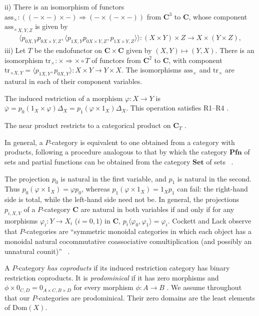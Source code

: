 \documentclass[letterpaper,10pt]{amsart}
\theoremstyle{plain}
\theoremstyle{definition}
\newcommand{\MAP}[3]{{#1}:{#2}\rightarrow{#3}}
\newcommand{\sento}[2]{{#1}\mapsto{#2}}
\newcommand{\rst}[1]{\overline{#1}}
\begin{document}
ii) There is an isomorphism of functors
$\mathrm{ass}_\times:((-\times-)\times-)\Rightarrow(-\times(-\times-))$
from $\mathbf C^3$ to $\mathbf C$, whose component
$\mathrm{\mathrm{ass}_\times}_{X,Y,Z}$  is given by
\begin{align*}
\MAP{{\langle p_{0 X,Y} p_{0 X\times Y,Z}, %
      \langle p_{1 X,Y} p_{0 X\times Y,Z}, %
       p_{1 X\times Y,Z}\rangle\rangle }}{ (X \times Y )\times Z}{ X\times (Y \times Z)},%
\end{align*}
iii) Let $T$ be the endofunctor on
$\mathbf{C}\times\mathbf{C}$ given by $\sento{(X,Y)}{(Y,X)}$.
There is an isomorphism
$\mathrm{tr}_\times:\times\Rightarrow\times\circ T$ of functors
from $\mathbf C^2$ to $\mathbf C$, with component
$\mathrm{tr}_{\times X,Y}=\langle p_{1X,Y},p_{0X,Y}\rangle:
X\times Y\to Y\times X$.
The isomorphisms $\mathrm{\mathrm{ass}_\times}$ and $\mathrm{tr}_\times$ are 
natural in each of their component variables. 

The induced restriction of a morphism $\varphi:X\to Y$ is
$\rst\varphi=p_0(1_X\times\varphi)\Delta_X
=p_1(\varphi\times1_X)\Delta_X$. This operation satisfies
R1--R4 \cite{MR88i:03078,coneit}.

The near product restricts to a categorical product on
$\mathbf C_T$ \cite{coneit}. 

In general, a $P$-category is equivalent to one obtained from a
category with products, following a procedure analogous to that by
which the category $\mathbf{Pfn}$ of sets and partial functions
can be obtained from the category $\mathbf{Set}$ of sets 
~\cite[Theorem 1.2]{MR90e:18001}.

The projection $p_0$ is natural in the first variable, and $p_1$ is
natural in the second. Thus $p_0(\varphi\times1_X)=\varphi p_0$,
whereas $p_1(\varphi\times1_X)=1_Xp_1$ can fail: the right-hand
side is total, while the left-hand side need not be. In
general, the projections $p_{i,X,Y}$ of a $P$-category
$\mathbf{C}$ are natural in both variables if and only if for any morphisms
$\MAP{\varphi_i}{Y}{X_i}$ ($i=0,1$) in 
$\mathbf{C}$, $p_i\langle \varphi_0,\varphi_1\rangle = \varphi_i$.
Cockett and Lack observe that $P$-categories are ``symmetric monoidal categories
in which each object has a monoidal natural cocommutative coassociative
comultiplication (and possibly an unnatural counit)'' ~\cite{MR1871071}.

A $P$-category \textit{has coproducts} if its induced restriction
category has binary restriction coproducts. It is \textit{prodominical}
if it has zero morphisms and $\phi\times0_{C,D}=0_{A\times C,B\times D}$
for every morphism $\phi:A\to B$ \cite{MR92e:03067}. We assume
throughout that our $P$-categories are prodominical. Their zero domains
are the least elements of $\mathrm{Dom}(X)$.
\end{document}
